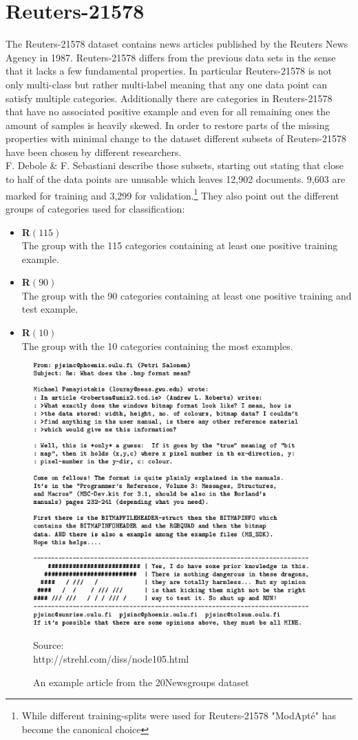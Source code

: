 \section{Reuters-21578}
The Reuters-21578 dataset contains news articles published by the Reuters News Agency in 1987. Reuters-21578 differs from the previous data sets in the sense that it lacks a few fundamental properties. In particular Reuters-21578 is not only multi-class but rather multi-label meaning that any one data point can satisfy multiple categories. Additionally there are categories in Reuters-21578 that have no associated positive example and even for all remaining ones the amount of samples is heavily skewed. In order to restore parts of the missing properties with minimal change to the dataset different subsets of Reuters-21578 have been chosen by different researchers.\\
F. Debole \& F. Sebastiani \cite{Reuters-Subsets} describe those subsets, starting out stating that close to half of the data points are unusable which leaves 12,902 documents. 9,603 are marked for training and 3,299 for validation.\footnote{While different training-splits were used for Reuters-21578 "ModApt\'e" has become the canonical choice} They also point out the different groups of categories used for classification:
\begin{itemize}
	\item \textbf{R$\left(115\right)$}\\
	The group with the 115 categories containing at least one positive training example.\\ 
	\item \textbf{R$\left(90\right)$}\\
	The group with the 90 categories containing at least one positive training and test example.\\ 
	\item \textbf{R$\left(10\right)$}\\
	The group with the 10 categories containing the most examples. \\
\end{itemize} 


\begin{figure}
	\centering
	\includegraphics[width=400px]{gfx/6-Datasets/20Newsgroups_examples.png}
	\caption{An example article from the 20Newsgroups dataset}
	\vspace{7pt}
	\footnotesize{
		Source:\\
		http://strehl.com/diss/node105.html
	}
	\label{fig:20Newsgroups-Examples}
\end{figure}